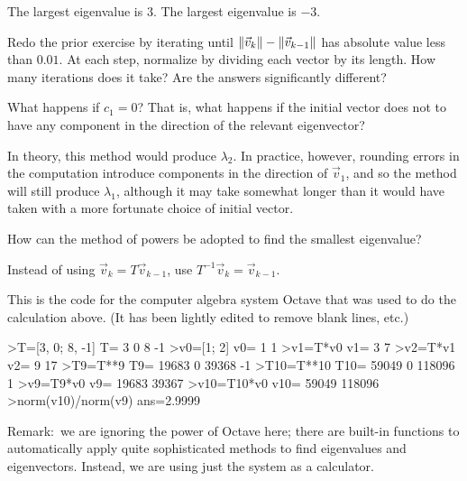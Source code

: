 \begin{exercises}
\begin{exparts*}
    \end{exparts*}
    \begin{answer}
     \begin{exparts}
       \partsitem The largest eigenvalue is $3$.
       \partsitem The largest eigenvalue is $-3$.
     \end{exparts}
    \end{answer}
  \item 
     Redo the prior exercise by iterating until 
     $\|\vec{v}_k\|-\|\vec{v}_{k-1}\|$ has absolute value less than
     $0.01$.
     At each step, normalize by dividing each vector by its length.
     How many iterations does it take?
     Are the answers significantly different?
  \item 
      What happens if $c_1=0$?
      That is, what happens if the initial vector does not to have any 
      component in the direction of the relevant eigenvector?
     \begin{answer}
       In theory, this method would produce $\lambda_2$.
       In practice, however, rounding errors in the computation introduce
       components in the direction of $\vec{v}_1$, and so the method will
       still produce $\lambda_1$, although it may take somewhat longer than
       it would have taken with a more fortunate choice of initial vector. 
     \end{answer}
  \item 
    How can the method of powers
    be adopted to find the smallest eigenvalue?
    \begin{answer}
      Instead of using $\vec{v}_k=T\vec{v}_{k-1}$, 
      use $T^{-1}\vec{v}_k=\vec{v}_{k-1}$.
    \end{answer}
\end{exercises}

\announcecomputercode
This is the code for the computer algebra system Octave that was used to
do the calculation above.
(It has been lightly edited to remove blank lines, etc.)
\begin{computercode}
>T=[3, 0;
    8, -1]
T=
   3   0
   8  -1
>v0=[1; 2]
v0=
   1
   1
>v1=T*v0
v1=
   3
   7
>v2=T*v1
v2=
   9
  17
>T9=T**9
T9=
  19683  0
  39368 -1
>T10=T**10
T10=
  59049  0
 118096  1
>v9=T9*v0
v9=
  19683
  39367
>v10=T10*v0
v10=
  59049
 118096
>norm(v10)/norm(v9)
ans=2.9999
\end{computercode}
Remark:~we are ignoring the power of Octave here;
there are built-in functions to automatically
apply quite sophisticated methods to find eigenvalues and eigenvectors.
Instead, we are using just the system as a calculator. 

\endinput





